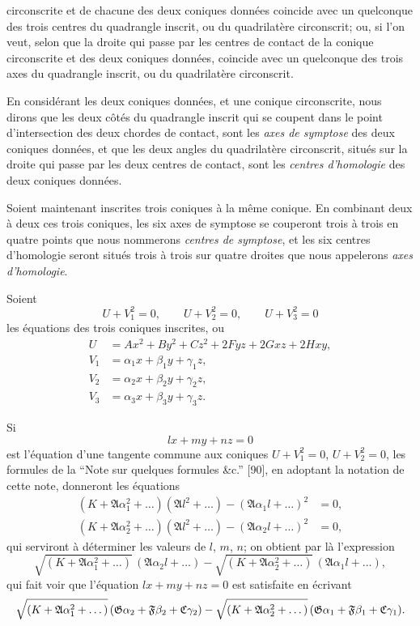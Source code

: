 \documentclass[11pt]{article}
\begin{document}
\smallskip

\noindent circonscrite et de chacune des deux coniques donn\'ees coincide avec un quelconque des trois centres du quadrangle inscrit, ou du quadrilat\`ere circonscrit; ou, si l'on veut, selon que la droite qui passe par les centres de contact de la conique circonscrite et des deux coniques donn\'ees, coincide avec un quelconque des trois axes du quadrangle inscrit, ou du quadrilat\`ere circonscrit.

En consid\'erant les deux coniques donn\'ees, et une conique circonscrite, nous dirons que les deux c\^ot\'es du quadrangle inscrit qui se coupent dans le point d'intersection des deux chordes de contact, sont les \emph{axes de symptose} des deux coniques donn\'ees, et que les deux angles du quadrilat\`ere circonscrit, situ\'es sur la droite qui passe par les deux centres de contact, sont les \emph{centres d'homologie} des deux coniques donn\'ees.

Soient maintenant inscrites trois coniques \`a la m\^eme conique. En combinant deux \`a deux ces trois coniques, les six axes de symptose se couperont trois \`a trois en quatre points que nous nommerons \emph{centres de symptose}, et les six centres d'homologie seront situ\'es trois \`a trois sur quatre droites que nous appelerons \emph{axes d'homologie}.

Soient
\[
U + V_{1}^{2} = 0,\qquad U + V_{2}^{2} = 0,\qquad U + V_{3}^{2} = 0
\]
les \'equations des trois coniques inscrites, ou
\[
\begin{aligned}
U &= A x^{2} + B y^{2} + C z^{2} + 2 F y z + 2 G x z + 2 H x y,\\
V_{1} &= \alpha_{1} x + \beta_{1} y + \gamma_{1} z,\\
V_{2} &= \alpha_{2} x + \beta_{2} y + \gamma_{2} z,\\
V_{3} &= \alpha_{3} x + \beta_{3} y + \gamma_{3} z.
\end{aligned}
\]

Si
\[
l x + m y + n z = 0
\]
est l'\'equation d'une tangente commune aux coniques $U + V_{1}^{2} = 0$, $U + V_{2}^{2} = 0$, les formules de la ``Note sur quelques formules \&c.'' [90], en adoptant la notation de cette note, donneront les \'equations
\[
\begin{aligned}
(K + \mathfrak{A}\alpha_{1}^{2} + \dots)(\mathfrak{A} l^{2} + \dots) - (\mathfrak{A}\alpha_{1} l + \dots)^{2} &= 0,\\
(K + \mathfrak{A}\alpha_{2}^{2} + \dots)(\mathfrak{A} l^{2} + \dots) - (\mathfrak{A}\alpha_{2} l + \dots)^{2} &= 0,
\end{aligned}
\]
qui serviront \`a d\'eterminer les valeurs de $l$, $m$, $n$; on obtient par l\`a l'expression
\[
\sqrt{(K + \mathfrak{A}\alpha_{1}^{2} + \dots)}\,(\mathfrak{A}\alpha_{2} l + \dots) - \sqrt{(K + \mathfrak{A}\alpha_{2}^{2} + \dots)}\,(\mathfrak{A}\alpha_{1} l + \dots),
\]
qui fait voir que l'\'equation $l x + m y + n z = 0$ est satisfaite en \'ecrivant
\[ \resizebox{\textwidth}{!}{$\displaystyle
\sqrt{(K + \mathfrak{A}\alpha_{1}^{2} + \dots)}\,(\mathfrak{G}\alpha_{2} + \mathfrak{F}\beta_{2} + \mathfrak{C}\gamma_{2}) - \sqrt{(K + \mathfrak{A}\alpha_{2}^{2} + \dots)}\,(\mathfrak{G}\alpha_{1} + \mathfrak{F}\beta_{1} + \mathfrak{C}\gamma_{1}).
$} \]
\end{document}
